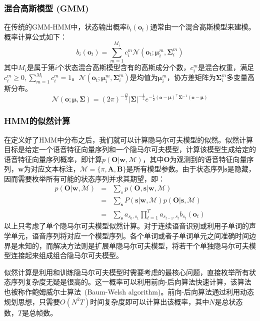 \subsubsection{混合高斯模型 (GMM)}
在传统的GMM-HMM中，状态输出概率$b_i(\mathbf{o}_t)$通常由一个混合高斯模型来建模。概率计算公式如下：
\begin{equation}
    b_i(\mathbf{o}_t)=\sum_{m=1}^{M_i}c^m_{i}\mathcal{N}(\mathbf{o}_t;\bm{\mu}^m_{i},\bm{\Sigma}^m_{i})
\end{equation}
其中$M_i$是属于第$i$个状态混合高斯模型含有的高斯成分个数，$c^m_{i}$是混合权重，满足$c^m_{i} \ge 0, \sum_{m=1}^{M_i} c^m_{i}=1$。$\mathcal{N}(\mathbf{o}_t;\bm{\mu}^m_{i},\bm{\Sigma}^m_{i})$是均值为$\bm{\mu}^m_{i}$，协方差矩阵为$\bm{\Sigma}^m_{i}$多变量高斯分布。
\begin{equation}
    \mathcal{N}(\mathbf{o};\bm{\mu},\bm{\Sigma})=(2\pi)^{-\frac{D}{2}}{|\bm{\Sigma}|}^{-\frac{1}{2}}e^{-\frac{1}{2}(\mathbf{o}-\bm{\mu})^{\top}\bm{\Sigma}^{-1}(\mathbf{o}-\bm{\mu})}
\end{equation}

\subsubsection{HMM的似然计算}
\label{sec:calc_like}
在定义好了HMM中分布之后，我们就可以计算隐马尔可夫模型的似然。似然计算目标是给定一个语音特征向量序列和一个隐马尔可夫模型，计算该模型生成给定的语音特征向量序列概率，即计算$p(\mathbf{O}|\mathbf{w},\mathcal{M})$，其中$\mathbf{O}$为观测到的语音特征向量序列，$\mathbf{w}$为对应文本标注，$\mathcal{M}=\{\pi, \mathbf{A}, \mathbf{B}\}$是所有模型参数。由于状态序列$\mathbf{s}$是隐藏，因而需要枚举所有可能的状态序列并求其期望，即：
\begin{eqnarray}
p(\mathbf{O}|\mathbf{w},\mathcal{M}) &=& \sum_{s}p(\mathbf{O},\mathbf{s}|\mathbf{w},\mathcal{M}) \\
&=& \sum_{\mathbf{s}} P(\mathbf{s}|\mathbf{w},\mathcal{M})p(\mathbf{O}|\mathbf{s},\mathcal{M}) \\
&=& \sum_{\mathbf{s}} a_{s_0, s_1}\prod_{t=1}^T a_{s_{t-1}, s_t}b_{s_t}(\mathbf{o}_t)
\end{eqnarray}
以上只考虑了单个隐马尔可夫模型似然计算。对于连续语音识别或利用子单词的声学单元，语音序列将对应一个模型序列。各个单词或者子单词单元之间准确时间边界是未知的，而解决方法则是扩展单隐马尔可夫模型，将若干个单独隐马尔可夫模型连接起来组成组合隐马尔可夫模型。

似然计算是利用和训练隐马尔可夫模型时需要考虑的最核心问题，直接枚举所有状态序列复杂度无疑是很高的。这一概率可以利用前向-后向算法快速计算，该算法也被称作鲍姆威尔士算法~\cite{baum1967inequality}(Baum-Welsh algorithm)。前向-后向算法通过利用动态规划思想，只需要$O(N^2T)$时间复杂度即可以计算出该概率，其中$N$是总状态数，$T$是总帧数。

